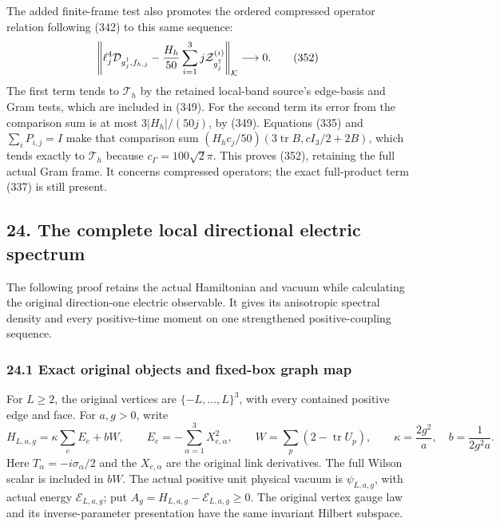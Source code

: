 \documentclass[
  11pt,
]{article}
\begin{document}
The added finite-frame test also promotes the ordered compressed
operator relation following (342) to this same sequence: \[
 \left\|\ell_j^4{\cal D}_{g_j^\dagger,f_{h,j}}
       -\frac{H_h}{50}\sum_{i=1}^3
                       j{\cal Z}_{g_j^\dagger}^{(i)}
 \right\|_{\mathcal K}\longrightarrow0.
 \tag{352}
\] The first term tends to \(\mathcal T_h\) by the retained local-band
source's edge-basis and Gram tests, which are included in (349). For the
second term its error from the comparison sum is at most
\(3|H_h|/(50j)\), by (349). Equations (335) and \(\sum_iP_{i,j}=I\) make
that comparison sum \((H_hc_j/50)(3\operatorname{tr}B,cI_3/2+2B)\),
which tends exactly to \(\mathcal T_h\) because
\(c_\Gamma=100\sqrt2\pi\). This proves (352), retaining the full actual
Gram frame. It concerns compressed operators; the exact full-product
term (337) is still present.

\subsection{24. The complete local directional electric
spectrum}\label{the-complete-local-directional-electric-spectrum}

The following proof retains the actual Hamiltonian and vacuum while
calculating the original direction-one electric observable. It gives its
anisotropic spectral density and every positive-time moment on one
strengthened positive-coupling sequence.

\subsubsection{24.1 Exact original objects and fixed-box graph
map}\label{exact-original-objects-and-fixed-box-graph-map}

For \(L\ge2\), the original vertices are \(\{-L,\ldots,L\}^3\), with
every contained positive edge and face. For \(a,g>0\), write \[
 H_{L,a,g}=\kappa\sum_eE_e+bW,\qquad
 E_e=-\sum_{\alpha=1}^3X_{e,\alpha}^2,\qquad
 W=\sum_p(2-\operatorname{tr}U_p),\qquad
 \kappa=\frac{2g^2}{a},\quad b=\frac1{2g^2a}.
 \tag{353}
\] Here \(T_\alpha=-i\sigma_\alpha/2\) and the \(X_{e,\alpha}\) are the
original link derivatives. The full Wilson scalar is included in \(bW\).
The actual positive unit physical vacuum is \(\psi_{L,a,g}\), with
actual energy \(\mathcal E_{L,a,g}\); put
\(A_g=H_{L,a,g}-\mathcal E_{L,a,g}\ge0\). The original vertex gauge law
and its inverse-parameter presentation have the same invariant Hilbert
subspace.
\end{document}
